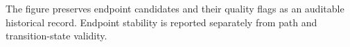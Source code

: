 The figure preserves endpoint candidates and their quality flags as an auditable historical record. Endpoint stability is reported separately from path and transition-state validity.
